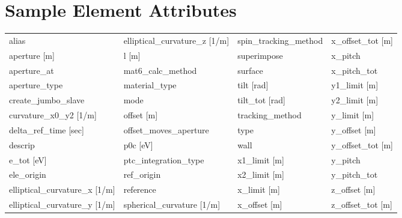 \section{Sample Element Attributes}
 \label{s:list.sample}
 
 \begin{tabular}{llll} \toprule
alias                            & elliptical_curvature_z [1/m]     & spin_tracking_method             & x_offset_tot [m]                 \\
aperture [m]                     & l [m]                            & superimpose                      & x_pitch                          \\
aperture_at                      & mat6_calc_method                 & surface                          & x_pitch_tot                      \\
aperture_type                    & material_type                    & tilt [rad]                       & y1_limit [m]                     \\
create_jumbo_slave               & mode                             & tilt_tot [rad]                   & y2_limit [m]                     \\
curvature_x0_y2 [1/m]            & offset [m]                       & tracking_method                  & y_limit [m]                      \\
delta_ref_time [sec]             & offset_moves_aperture            & type                             & y_offset [m]                     \\
descrip                          & p0c [eV]                         & wall                             & y_offset_tot [m]                 \\
e_tot [eV]                       & ptc_integration_type             & x1_limit [m]                     & y_pitch                          \\
ele_origin                       & ref_origin                       & x2_limit [m]                     & y_pitch_tot                      \\
elliptical_curvature_x [1/m]     & reference                        & x_limit [m]                      & z_offset [m]                     \\
elliptical_curvature_y [1/m]     & spherical_curvature [1/m]        & x_offset [m]                     & z_offset_tot [m]                 \\
 \bottomrule
 \end{tabular}
 \vfill
 
